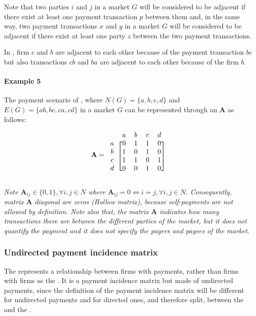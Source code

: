 \documentclass[12pt]{article}
\begin{document}
\begin{multicols}{2}
Note that two parties $i$ and $j$ in a market $G$ will be considered to be adjacent if there exist at least one payment transaction $p$ between them and, in the same way, two payment transactions $x$ and $y$ in a market $G$ will be considered to be adjacent if there exist at least one party $z$ between the two payment transactions. 

In , firm $c$ and $b$ are adjacent to each other because of the payment transaction $bc$ but also transactions $cb$ and $ba$ are adjacent to each other because of the firm $b$. 

\begin{mdframed}
\paragraph{Example 5} \label{ex5}
The payment scenario of , where  $N(G) = \{a, b, c, d\}$ and $E(G) = \{ab, bc, ca, cd\}$ in a market $G$ can be represented through an  $\textbf{A}$ as follows:


\begin{equation} \label{eq6}
    \textbf{A} = \begin{blockarray}{ccccc}
 & a & b & c & d \\
\begin{block}{c[cccc]}
  a & 0 & 1 & 1 & 0 \\
  b & 1 & 0 & 1 & 0 \\
  c & 1 & 1 & 0 & 1 \\
  d & 0 & 0 & 1 & 0 \\
\end{block}
\end{blockarray}
\end{equation}

\emph{Note $\textbf{A}_{ij} \in \{0, 1\}, \forall i, j \in N$ where $\textbf{A}_{ij} = 0 \iff i = j, \forall i, j \in N$. Consequently, matrix $\textbf{A}$ diagonal are zeros (Hollow matrix), because self-payments are not allowed by definition. Note also that, the matrix  $\textbf{A}$ indicates how many transactions there are between the different parties of the market, but it does not quantify the payment and it does not specify the payers and payees of the market.}

\end{mdframed}

\subsubsection{Undirected payment incidence matrix} \label{upim}
The  represents a relationship between firms with payments, rather than firms with firms as the . It is a payment incidence matrix but made of undirected payments, since the definition of the payment incidence matrix will be different for undirected payments and for directed ones, and therefore split, between the  and the .


\end{multicols}
\end{document}
